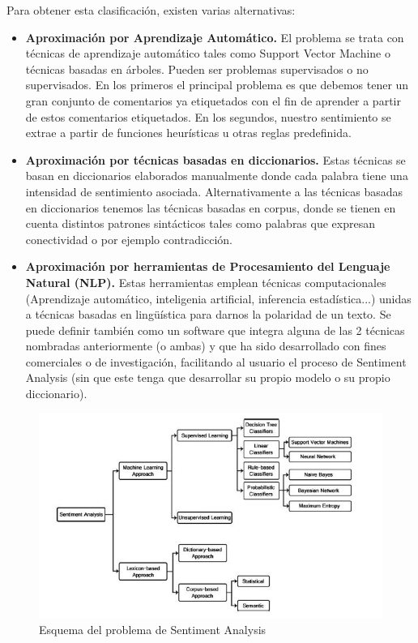 \documentclass{article}
\begin{document}
Para obtener esta clasificación, existen varias alternativas:
\begin{itemize}
	\item \textbf{Aproximación por Aprendizaje Automático.} El problema se trata con técnicas de aprendizaje automático tales como Support Vector Machine o técnicas basadas en árboles. Pueden ser problemas supervisados o no supervisados. En los primeros el principal problema es que debemos tener un gran conjunto de comentarios ya etiquetados con el fin de aprender a partir de estos comentarios etiquetados. En los segundos, nuestro sentimiento se extrae a partir de funciones heurísticas u otras reglas predefinida.
	\item \textbf{Aproximación por técnicas basadas en diccionarios.} Estas técnicas se basan en diccionarios elaborados manualmente donde cada palabra tiene una intensidad de sentimiento asociada. Alternativamente a las técnicas basadas en diccionarios tenemos las técnicas basadas en corpus, donde se tienen en cuenta distintos patrones sintácticos tales como palabras que expresan conectividad o por ejemplo contradicción.
	\item  \textbf{Aproximación por herramientas de Procesamiento del Lenguaje Natural (NLP).} Estas herramientas emplean técnicas computacionales (Aprendizaje automático, inteligenia artificial, inferencia estadística...) unidas a técnicas basadas en lingüística para darnos la polaridad de un texto. Se puede definir también como un software que integra alguna de las 2 técnicas nombradas anteriormente (o ambas) y que ha sido desarrollado con fines comerciales o de investigación, facilitando al usuario el proceso de Sentiment Analysis (sin que este tenga que desarrollar su propio modelo o su propio diccionario).
\end{itemize}

\begin{figure}
	\centering
	\includegraphics[width=0.7\linewidth]{clasificationScheme}
	\caption{Esquema del problema de Sentiment Analysis}
	\label{fig:clasificationscheme}
\end{figure}
\end{document}
